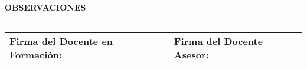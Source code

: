 \documentclass[a4paper,12pt]{article}
\begin{document}
\vspace{0.5cm}
\noindent
\textbf{OBSERVACIONES}
\begin{tabularx}{\textwidth}{|X|}
    \hline
    \vspace{3cm} \\ \hline
\end{tabularx}

\vspace{0.5cm}
\begin{center}
    \begin{tabular}{p{7cm}p{7cm}}
        \hline
        \textbf{Firma del Docente en Formación:} \hrulefill & \textbf{Firma del Docente Asesor:} \hrulefill \\
    \end{tabular}
\end{center}
\end{document}
